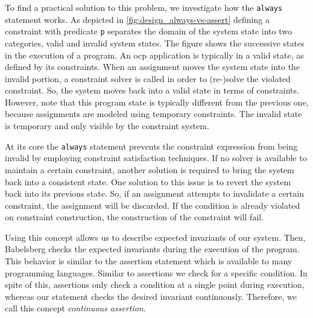 
To find a practical solution to this problem, we investigate how the \texttt{always} statement works.
%
As depicted in \autoref{fig:design_always-vs-assert} defining a constraint with predicate \texttt{p} separates the domain of the system state into two categories, valid and invalid system states. The figure shows the successive states in the execution of a program. An \gls{ocp} application is typically in a valid state, as defined by its constraints. When an assignment moves the system state into the invalid portion, a constraint solver is called in order to (re-)solve the violated constraint. So, the system moves back into a valid state in terms of constraints. However, note that this program state is typically different from the previous one, because assignments are modeled using temporary constraints.
The invalid state is temporary and only visible by the constraint system.

At its core the \texttt{always} statement prevents the constraint expression from being invalid by employing constraint satisfaction techniques.
%
If no solver is available to maintain a certain constraint, another solution is required to bring the system back into a consistent state.
One solution to this issue is to revert the system back into its previous state.
So, if an assignment attempts to invalidate a certain constraint, the assignment will be discarded.
If the condition is already violated on constraint construction, the construction of the constraint will fail.

Using this concept allows us to describe expected invariants of our system. Then, Babelsberg checks the expected invariants during the execution of the program.
This behavior is similar to the assertion statement which is available to many programming languages.
Similar to assertions we check for a specific condition. In spite of this, assertions only check a condition at a single point during execution, whereas our statement checks the desired invariant continuously. Therefore, we call this concept \emph{continuous assertion}.

